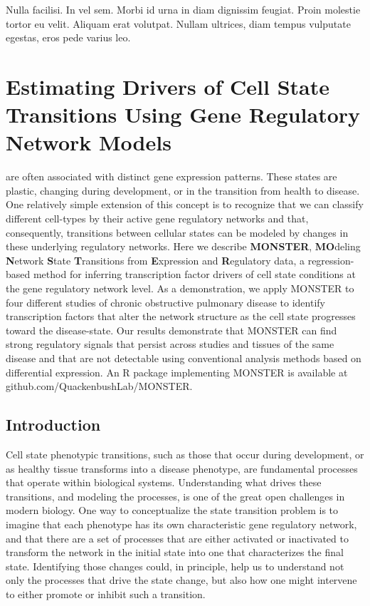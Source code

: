 \begin{savequote}[75mm]
Nulla facilisi. In vel sem. Morbi id urna in diam dignissim feugiat. Proin molestie tortor eu velit. Aliquam erat volutpat. Nullam ultrices, diam tempus vulputate egestas, eros pede varius leo.
\end{savequote}

\chapter{Estimating Drivers of Cell State Transitions Using Gene Regulatory Network Models}



 are often associated with distinct gene expression patterns. These states are plastic, changing during development, or in the transition from health to disease. One relatively simple extension of this concept is to recognize that we can classify different cell-types by their active gene regulatory networks and that, consequently, transitions between cellular states can be modeled by changes in these underlying regulatory networks. Here we describe \textbf{MONSTER}, \textbf{MO}deling \textbf{N}etwork \textbf{S}tate \textbf{T}ransitions from \textbf{E}xpression and \textbf{R}egulatory data, a regression-based method for inferring transcription factor drivers of cell state conditions at the gene regulatory network level. As a demonstration, we apply MONSTER to four different studies of chronic obstructive pulmonary disease to identify transcription factors that alter the network structure as the cell state progresses toward the disease-state. Our results demonstrate that MONSTER can find strong regulatory signals that persist across studies and tissues of the same disease and that are not detectable using conventional analysis methods based on differential expression. An R package implementing MONSTER is available at github.com/QuackenbushLab/MONSTER.

 
\section*{Introduction}
Cell state phenotypic transitions, such as those that occur during development, or as healthy tissue transforms into a disease phenotype, are fundamental processes that operate within biological systems. Understanding what drives these transitions, and modeling the processes, is one of the great open challenges in modern biology. One way to conceptualize the state transition problem is to imagine that each phenotype has its own characteristic gene regulatory network, and that there are a set of processes that are either activated or inactivated to transform the network in the initial state into one that characterizes the final state. Identifying those changes could, in principle, help us to understand not only the processes that drive the state change, but also how one might intervene to either promote or inhibit such a transition.

